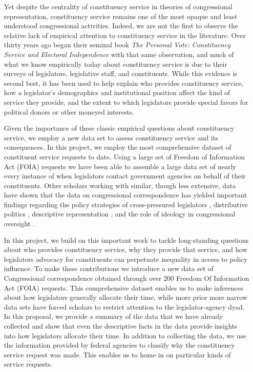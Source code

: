 \documentclass{article}
\begin{document}
Yet despite the centrality of constituency service in theories of congressional representation, constituency service remains one of the most opaque and least understood congressional activities. Indeed, we are not the first to observe the relative lack of empirical attention to constituency service in the literature.  Over thirty years ago \citet*{CainFerejohnFiorina1987} began their seminal book \emph{The Personal Vote: Constituency Service and Electoral Independence} with that same observation, and much of what we know empirically today about constituency service is due to their surveys of legislators, legislative staff, and constituents.  While this evidence is second best, it has been used to help explain who provides constituency service, how a legislator's demographics and institutional position affect the kind of service they provide, and the extent to which legislators provide special favors for political donors or other moneyed interests.  

Given the importance of these classic empirical questions about constituency service, we employ a new data set to assess constituency service and its consequences.  In this project, we employ the most comprehensive dataset of constituent service requests to date.  Using a large set of Freedom of Information Act (FOIA) requests we have been able to assemble a large data set of nearly every instance of when legislators contact government agencies on behalf of their constituents.  Other scholars working with similar, though less extensive, data have shown that the data on congressional correspondence has yielded important findings regarding the policy strategies of cross-pressured legislators \citep{Ritchie2017}, distributive politics \citep{MillsKalafHuges2015}, descriptive representation \citep{LowandeRitchieLauterbach2018}, and the role of ideology in congressional oversight \citep{Lowande2018JOP}.  

In this project, we build on this important work to tackle long-standing questions about who provides constituency service, why they provide that service, and how legislators advocacy for constituents can perpetuate inequality in access to policy influence.  To make these contributions we introduce a new data set of Congressional correspondence obtained through over 200 Freedom Of Information Act (FOIA) requests.  This comprehensive dataset enables us to make inferences about how legislators generally allocate their time, while more prior more narrow data sets have forced scholars to restrict attention to the legislator-agency dyad.  In this proposal, we provide a summary of the data that we have already collected and show that even the descriptive facts in the data provide insights into how legislators allocate their time.  In addition to collecting the data, we use the information provided by federal agencies to classify why the constituency service request was made.  This enables us to home in on particular kinds of service requests. 
\end{document}
